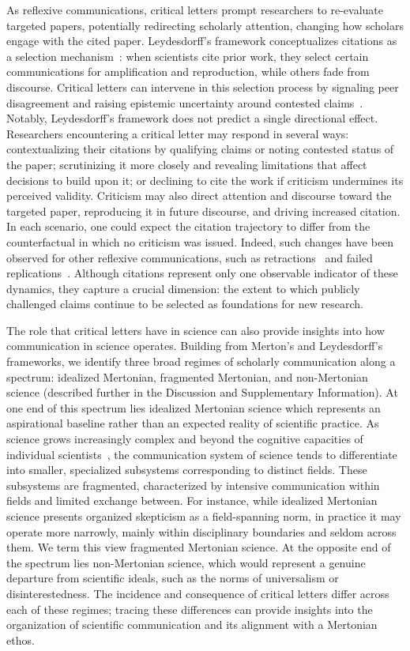 \documentclass[12pt,a4paper]{article}
\numberwithin{equation}{section}
\def\appendix{Supplementary Information}
\begin{document}
As reflexive communications, critical letters prompt researchers to re-evaluate targeted papers, potentially redirecting scholarly attention, changing how scholars engage with the cited paper.
Leydesdorff's framework conceptualizes citations as a selection mechanism~\cite{leydesdorff2001sociological}: when scientists cite prior work, they select certain communications for amplification and reproduction, while others fade from discourse.
Critical letters can intervene in this selection process by signaling peer disagreement and raising epistemic uncertainty around contested claims~\cite{christensen_2007_disagreement}.
Notably, Leydesdorff's framework does not predict a single directional effect.
Researchers encountering a critical letter may respond in several ways: contextualizing their citations by qualifying claims or noting contested status of the paper; scrutinizing it more closely and revealing limitations that affect decisions to build upon it; or declining to cite the work if criticism undermines its perceived validity.
Criticism may also direct attention and discourse toward the targeted paper, reproducing it in future discourse, and driving increased citation.
In each scenario, one could expect the citation trajectory to differ from the counterfactual in which no criticism was issued.
Indeed, such changes have been observed for other reflexive communications, such as retractions~\cite{azoulay_2015_retractions} and failed replications~\cite{vonHippel2022replication,clark2023replicate}.
Although citations represent only one observable indicator of these dynamics, they capture a crucial dimension: the extent to which publicly challenged claims continue to be selected as foundations for new research.

The role that critical letters have in science can also provide insights into how communication in science operates. 
Building from Merton's and Leydesdorff's frameworks, we identify three broad regimes of scholarly communication along a spectrum: idealized Mertonian, fragmented Mertonian, and non-Mertonian science (described further in the Discussion and \appendix).
At one end of this spectrum lies idealized Mertonian science which represents an aspirational baseline rather than an expected reality of scientific practice. 
As science grows increasingly complex and beyond the cognitive capacities of individual scientists~\cite{pan2018myopia}, the communication system of science tends to differentiate into smaller, specialized subsystems corresponding to distinct fields.
These subsystems are fragmented, characterized by intensive communication within fields and limited exchange between.
For instance, while idealized Mertonian science presents organized skepticism as a field-spanning norm, in practice it may operate more narrowly, mainly within disciplinary boundaries and seldom across them.
We term this view fragmented Mertonian science.
At the opposite end of the spectrum lies non-Mertonian science, which would represent a genuine departure from scientific ideals, such as the norms of universalism or disinterestedness.
The incidence and consequence of critical letters differ across each of these regimes; tracing these differences can provide insights into the organization of scientific communication and its alignment with a Mertonian ethos. 
\end{document}
